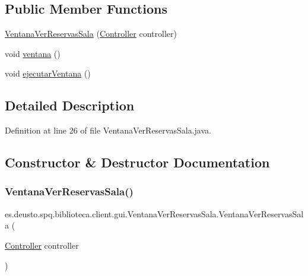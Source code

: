 \subsection*{Public Member Functions}
\begin{DoxyCompactItemize}
\item 
\mbox{\hyperlink{classes_1_1deusto_1_1spq_1_1biblioteca_1_1client_1_1gui_1_1_ventana_ver_reservas_sala_a442cdd7ff976480949f709fcfcb91025}{Ventana\+Ver\+Reservas\+Sala}} (\mbox{\hyperlink{classes_1_1deusto_1_1spq_1_1biblioteca_1_1controller_1_1_controller}{Controller}} controller)
\item 
void \mbox{\hyperlink{classes_1_1deusto_1_1spq_1_1biblioteca_1_1client_1_1gui_1_1_ventana_ver_reservas_sala_a0530d61d6fe002ba70b7a520c5cec330}{ventana}} ()
\item 
void \mbox{\hyperlink{classes_1_1deusto_1_1spq_1_1biblioteca_1_1client_1_1gui_1_1_ventana_ver_reservas_sala_a405dbde710635ada1ad7c4514cda6ff6}{ejecutar\+Ventana}} ()
\end{DoxyCompactItemize}


\subsection{Detailed Description}


Definition at line 26 of file Ventana\+Ver\+Reservas\+Sala.\+java.



\subsection{Constructor \& Destructor Documentation}
\mbox{\label{classes_1_1deusto_1_1spq_1_1biblioteca_1_1client_1_1gui_1_1_ventana_ver_reservas_sala_a442cdd7ff976480949f709fcfcb91025}} 
\subsubsection{\texorpdfstring{Ventana\+Ver\+Reservas\+Sala()}{VentanaVerReservasSala()}}
{\footnotesize\ttfamily es.\+deusto.\+spq.\+biblioteca.\+client.\+gui.\+Ventana\+Ver\+Reservas\+Sala.\+Ventana\+Ver\+Reservas\+Sala (\begin{DoxyParamCaption}\item[{\mbox{\hyperlink{classes_1_1deusto_1_1spq_1_1biblioteca_1_1controller_1_1_controller}{Controller}}}]{controller }\end{DoxyParamCaption})}

